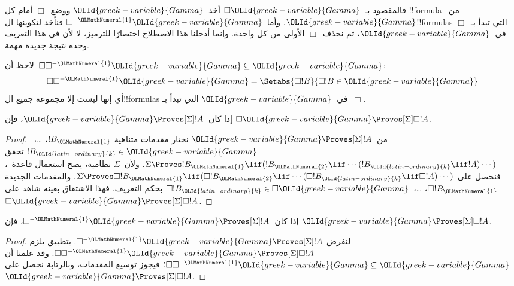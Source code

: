 \documentclass[../../../include/open-logic-section]{subfiles}
\begin{document}
فالمقصود بـ~$\Box\OLId{greek-variable}{Gamma}$ أخذ~$\OLId{greek-variable}{Gamma}$ ووضع~$\Box$ أمام كل
!!{formula} من~$\OLId{greek-variable}{Gamma}$. وأما~$\Box^{-\OLMathNumeral{1}}\OLId{greek-variable}{Gamma}$ فنأخذ لتكوينها
ال!!{formula}s التي تبدأ بـ~$\Box$ في~$\OLId{greek-variable}{Gamma}$، ثم نحذف~$\Box$ الأولى
من كل واحدة. وإنما أدخلنا هذا الاصطلاح اختصارًا للترميز،
لا لأن في هذا التعريف وحده نتيجة جديدة مهمة.

لاحظ أن~$\Box\Box^{-\OLMathNumeral{1}}\OLId{greek-variable}{Gamma} \subseteq \OLId{greek-variable}{Gamma}$:
\[
\Box\Box^{-\OLMathNumeral{1}}\OLId{greek-variable}{Gamma} = \Setabs{\Box!B}{\Box!B \in \OLId{greek-variable}{Gamma}}
\]
أي إنها ليست إلا مجموعة جميع ال!!{formula}s في~$\OLId{greek-variable}{Gamma}$ التي تبدأ
بـ~$\Box$.

\begin{lem}
  إذا كان~$\OLId{greek-variable}{Gamma} \Proves[\Sigma] !A$، فإن
  $\Box\OLId{greek-variable}{Gamma} \Proves[\Sigma] \Box !A$.
\end{lem}

\begin{proof}
  من~$\OLId{greek-variable}{Gamma} \Proves[\Sigma] !A$ نختار مقدمات متناهية
  $!B_\OLMathNumeral{1}$، \dots،~$!B_\OLId{latin-ordinary}{k} \in \OLId{greek-variable}{Gamma}$ تحقق
  $\Sigma \Proves !B_\OLMathNumeral{1} \lif (!B_\OLMathNumeral{2} \lif \cdots (!B_\OLId{latin-ordinary}{k} \lif !A)\cdots)$.
  ولأن~$\Sigma$ نظامية، يصح استعمال قاعدة~\RK{}، فنحصل على
  $\Sigma \Proves \Box!B_\OLMathNumeral{1} \lif (\Box!B_\OLMathNumeral{2} \lif \cdots
  (\Box!B_\OLId{latin-ordinary}{k} \lif \Box!A)\cdots)$.
  والمقدمات الجديدة $\Box!B_\OLMathNumeral{1}$، \dots،~$\Box!B_\OLId{latin-ordinary}{k} \in \Box\OLId{greek-variable}{Gamma}$
  بحكم التعريف. فهذا الاشتقاق بعينه شاهد على
  $\Box\OLId{greek-variable}{Gamma} \Proves[\Sigma] \Box !A$.
\end{proof}

\begin{lem}
  إذا كان~$\Box^{-\OLMathNumeral{1}}\OLId{greek-variable}{Gamma} \Proves[\Sigma] !A$، فإن
  $\OLId{greek-variable}{Gamma} \Proves[\Sigma] \Box!A$.
\end{lem}

\begin{proof}
  لنفرض $\Box^{-\OLMathNumeral{1}}\OLId{greek-variable}{Gamma} \Proves[\Sigma] !A$.
  بتطبيق  يلزم
  $\Box\Box^{-\OLMathNumeral{1}}\OLId{greek-variable}{Gamma} \Proves[\Sigma] \Box!A$.
  وقد علمنا أن $\Box\Box^{-\OLMathNumeral{1}}\OLId{greek-variable}{Gamma} \subseteq \OLId{greek-variable}{Gamma}$؛
  فيجوز توسيع المقدمات، وبالرتابة نحصل على
  $\OLId{greek-variable}{Gamma} \Proves[\Sigma] \Box!A$.
\end{proof}
\end{document}
